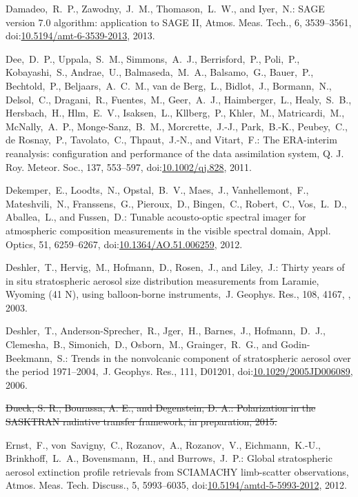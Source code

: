 \documentclass[amtd, online, hvmath]{copernicus}
\providecommand{\DIFdel}[1]{{\protect\color{red}\sout{#1}}}                      %
\providecommand{\DIFdelbegin}{} %
\providecommand{\DIFdelend}{} %
\begin{document}
\begin{thebibliography}{99}
Damadeo,~R.~P., Zawodny,~J.~M., Thomason,~L.~W., and Iyer,~N.: SAGE version
7.0 algorithm: application to SAGE II, Atmos. Meas. Tech., 6, 3539--3561,
doi:\href{http://dx.doi.org/10.5194/amt-6-3539-2013}{10.5194/amt-6-3539-2013},
2013.



Dee,~D.~P., Uppala,~S.~M., Simmons,~A.~J., Berrisford,~P., Poli,~P.,
Kobayashi,~S., Andrae,~U., Balmaseda,~M.~A., Balsamo,~G., Bauer,~P.,
Bechtold,~P., Beljaars,~A.~C.~M., van de Berg,~L., Bidlot,~J., Bormann,~N.,
Delsol,~C., Dragani,~R., Fuentes,~M., Geer,~A.~J., Haimberger,~L.,
Healy,~S.~B., Hersbach,~H., Hlm,~E.~V., Isaksen,~L., Kllberg,~P., Khler,~M.,
Matricardi,~M., McNally,~A.~P., Monge-Sanz,~B.~M., Morcrette,~J.-J.,
Park,~B.-K., Peubey,~C., de Rosnay,~P., Tavolato,~C., Thpaut,~J.-N., and
Vitart,~F.: The ERA-interim reanalysis: configuration and performance of the
data assimilation system, Q. J. Roy. Meteor. Soc., 137, 553--597,
doi:\href{http://dx.doi.org/10.1002/qj.828}{10.1002/qj.828}, 2011.


Dekemper,~E., Loodts,~N., Opstal,~B.~V., Maes,~J., Vanhellemont,~F.,
Mateshvili,~N., Franssens,~G., Pieroux,~D., Bingen,~C., Robert,~C.,
Vos,~L.~D., Aballea,~L., and Fussen,~D.: Tunable acousto-optic spectral
imager for atmospheric composition measurements in the visible spectral
domain, Appl. Optics, 51, 6259--6267,
doi:\href{http://dx.doi.org/10.1364/AO.51.006259}{10.1364/AO.51.006259},
2012.


Deshler,~T., Hervig,~M., Hofmann,~D., Rosen,~J., and Liley,~J.: Thirty years
of in situ stratospheric aerosol size distribution measurements from Laramie,
Wyoming (41 N), using balloon-borne instruments,~J. Geophys. Res., 108, 4167,
, 2003.


Deshler,~T., Anderson-Sprecher,~R., Jger,~H., Barnes,~J., Hofmann,~D.~J.,
Clemesha,~B., Simonich,~D., Osborn,~M., Grainger,~R.~G., and
Godin-Beekmann,~S.: Trends in the nonvolcanic component of stratospheric
aerosol over the period 1971--2004,~J. Geophys. Res., 111, D01201,
doi:\href{http://dx.doi.org/10.1029/2005JD006089}{10.1029/2005JD006089},
2006.


\DIFdelbegin %
\DIFdel{Dueck, S. R., Bourassa, A. E., and Degenstein, D. A.: Polarization in the
SASKTRAN radiative transfer framework, in preparation, 2015.
}%

\DIFdelend {}
Ernst,~F., von~Savigny,~C., Rozanov,~A., Rozanov,~V., Eichmann,~K.-U.,
Brinkhoff,~L.~A., Bovensmann,~H., and Burrows,~J.~P.: Global stratospheric
aerosol extinction profile retrievals from SCIAMACHY limb-scatter
observations, Atmos. Meas. Tech. Discuss., 5, 5993--6035,
doi:\href{http://dx.doi.org/10.5194/amtd-5-5993-2012}{10.5194/amtd-5-5993-2012},
2012.





\end{thebibliography}
\end{document}
